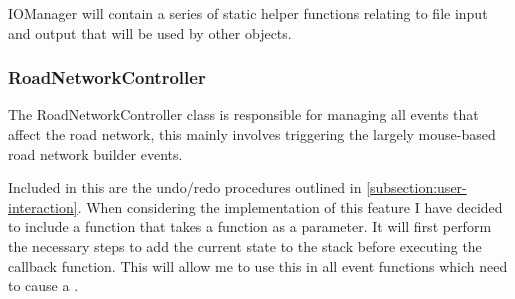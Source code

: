             IOManager will contain a series of static helper functions relating to file input and output that will be used by other objects.


        \subsubsection{RoadNetworkController}

            The RoadNetworkController class is responsible for managing all events that affect the road network, this mainly involves triggering the largely mouse-based road network builder events.

            Included in this are the undo/redo procedures outlined in \autoref{subsection:user-interaction}. When considering the implementation of this feature I have decided to include a  function that takes a function as a parameter. It will first perform the necessary steps to add the current state to the stack before executing the callback function. This will allow me to use this in all event functions which need to cause a .

